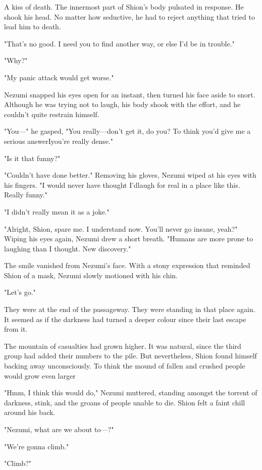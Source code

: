 A kiss of death. The innermost part of Shion's body pulsated in
response. He shook his head. No matter how seductive, he had to reject
anything that tried to lead him to death.

"That's no good. I need you to find another way, or else I'd be in
trouble."

"Why?"

"My panic attack would get worse."

Nezumi snapped his eyes open for an instant, then turned his face aside
to snort. Although he was trying not to laugh, his body shook with the
effort, and he couldn't quite restrain himself.

"You---" he gasped, "You really---don't get it, do you? To think you'd\el 
give me a serious answer\el I\el you're really dense."

"Is it that funny?"

"Couldn't have done better." Removing his gloves, Nezumi wiped at his
eyes with his fingers. "I would never have thought I'd\el laugh for real
in a place like this. Really funny."

"I didn't really mean it as a joke."

"Alright, Shion, spare me. I understand now. You'll never go insane,
yeah?" Wiping his eyes again, Nezumi drew a short breath. "Humans are
more prone to laughing than I thought. New discovery."

The smile vanished from Nezumi's face. With a stony expression that
reminded Shion of a mask, Nezumi slowly motioned with his chin.

"Let's go."

They were at the end of the passageway. They were standing in that place
again. It seemed as if the darkness had turned a deeper colour since
their last escape from it.

The mountain of casualties had grown higher. It was natural, since the
third group had added their numbers to the pile. But nevertheless, Shion
found himself backing away unconsciously. To think the mound of fallen
and crushed people would grow even larger\el 

"Hmm, I think this would do," Nezumi muttered, standing amongst the
torrent of darkness, stink, and the groans of people unable to die.
Shion felt a faint chill around his back.

"Nezumi, what are we about to---?"

"We're gonna climb."

"Climb?"

